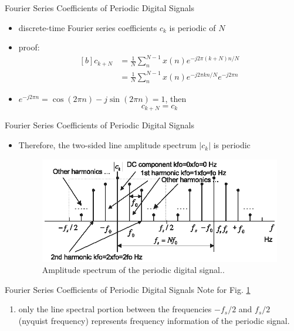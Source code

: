 \documentclass[pdflatex,compress,mathserif]{beamer}
\begin{document}
\begin{frame}{Fourier Series Coefficients of Periodic Digital Signals}
    \begin{itemize}
        \item discrete-time Fourier series coefficients $c_k$ is periodic of $N$
        \item proof:
        \begin{equation}
            \begin{aligned}[b]
                c_{k+N} &= \frac{1}{N} \sum_{n}^{N-1}x(n)e^{-j2\pi (k+N) n/N} \\
                &= \frac{1}{N} \sum_{n}^{N-1}x(n)e^{-j2\pi k n/N} e^{-j2\pi n}
            \end{aligned}
        \end{equation}
        \item $e^{-j2\pi n} = \cos(2\pi n) - j\sin(2 \pi n) = 1$, then
        \begin{equation}
            c_{k+N} = c_k
            \label{eq:4.4}
        \end{equation}
    \end{itemize}
\end{frame}

\begin{frame}{Fourier Series Coefficients of Periodic Digital Signals}
    \begin{itemize}
        \item Therefore, the two-sided line amplitude spectrum $|c_k|$ is periodic
        \begin{figure}
            \includegraphics[width=\linewidth]{fig/fig.4.03}
            \caption{Amplitude spectrum of the periodic digital signal..}
            \label{fig:04.03}
        \end{figure}
    \end{itemize}
\end{frame}

\begin{frame}{Fourier Series Coefficients of Periodic Digital Signals}
    Note for Fig. \ref{fig:04.03}
    \begin{enumerate}
        \item only the line spectral portion between the frequencies $-f_s/2$ and $f_s/2$ (nyquist frequency) represents frequency information of the periodic signal.
    \end{enumerate}
\end{frame}
\end{document}
